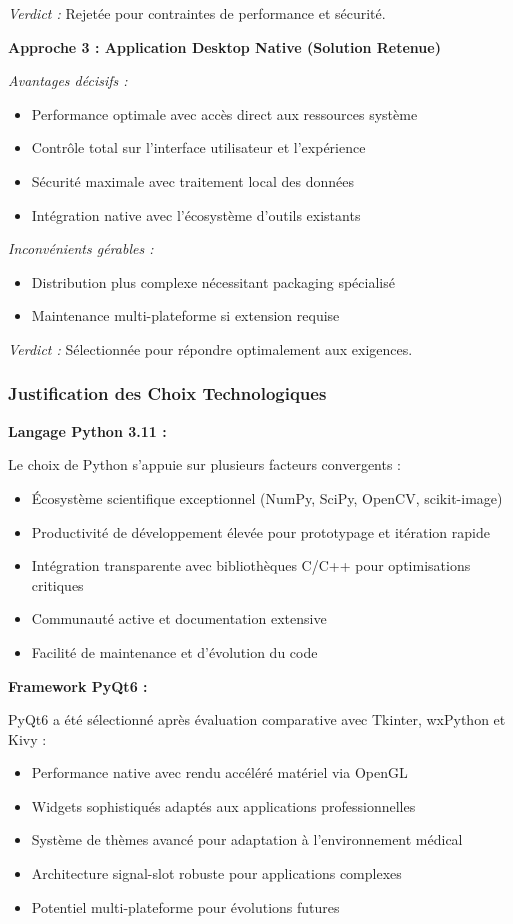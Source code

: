\documentclass[12pt,a4paper]{article}
\begin{document}
\textit{Verdict :} Rejetée pour contraintes de performance et sécurité.

\textbf{Approche 3 : Application Desktop Native (Solution Retenue)}

\textit{Avantages décisifs :}
\begin{itemize}
\item Performance optimale avec accès direct aux ressources système
\item Contrôle total sur l'interface utilisateur et l'expérience
\item Sécurité maximale avec traitement local des données
\item Intégration native avec l'écosystème d'outils existants
\end{itemize}

\textit{Inconvénients gérables :}
\begin{itemize}
\item Distribution plus complexe nécessitant packaging spécialisé
\item Maintenance multi-plateforme si extension requise
\end{itemize}

\textit{Verdict :} Sélectionnée pour répondre optimalement aux exigences.

\subsubsection{Justification des Choix Technologiques}

\textbf{Langage Python 3.11 :}

Le choix de Python s'appuie sur plusieurs facteurs convergents :
\begin{itemize}
\item Écosystème scientifique exceptionnel (NumPy, SciPy, OpenCV, scikit-image)
\item Productivité de développement élevée pour prototypage et itération rapide
\item Intégration transparente avec bibliothèques C/C++ pour optimisations critiques
\item Communauté active et documentation extensive
\item Facilité de maintenance et d'évolution du code
\end{itemize}

\textbf{Framework PyQt6 :}

PyQt6 a été sélectionné après évaluation comparative avec Tkinter, wxPython et Kivy :
\begin{itemize}
\item Performance native avec rendu accéléré matériel via OpenGL
\item Widgets sophistiqués adaptés aux applications professionnelles
\item Système de thèmes avancé pour adaptation à l'environnement médical
\item Architecture signal-slot robuste pour applications complexes
\item Potentiel multi-plateforme pour évolutions futures
\end{itemize}
\end{document}
